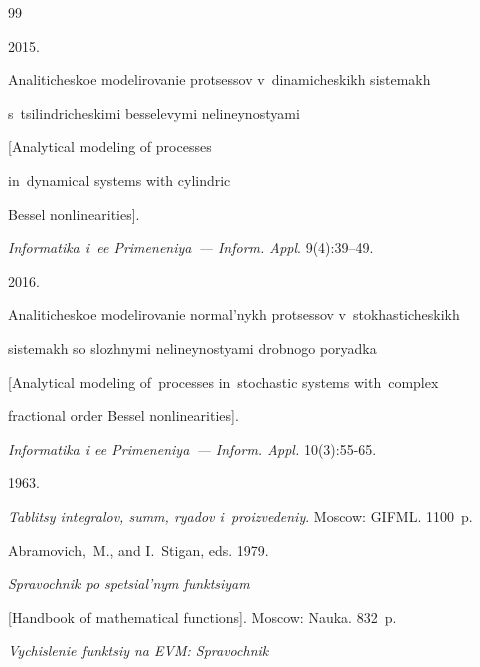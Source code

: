 {\small\frenchspacing

{%


\begin{thebibliography}{99}


 2015.

Analiticheskoe modelirovanie protsessov v~dinamicheskikh sistemakh 

s~tsilindricheskimi besselevymi nelineynostyami

[Analytical modeling of processes

in~dynamical systems with cylindric

Bessel nonlinearities].

\textit{Informatika i~ee Primeneniya~--- Inform. Appl}. 9(4):39--49.




 2016.

Analiticheskoe modelirovanie normal'nykh protsessov v~sto\-kha\-sti\-cheskikh 

sistemakh so slozhnymi nelineynostyami drobnogo poryadka

[Analytical modeling of~processes in~stochastic systems with~complex

fractional order Bessel nonlinearities].

\textit{Informatika i ee Primeneniya~--- Inform. Appl.} 10(3):55-65.




 1963.

\textit{Tablitsy integralov, summ, ryadov i~proizvedeniy}. Moscow: GIFML. 1100~p.




Abramovich,~M., and I.~Stigan, eds. 1979.

\textit{Spravochnik po spetsial'nym funktsiyam}

[Handbook of mathematical functions]. Moscow: Nauka. 832~p.





\textit{Vychislenie funktsiy na EVM: Spravochnik}


\end{thebibliography}}}
